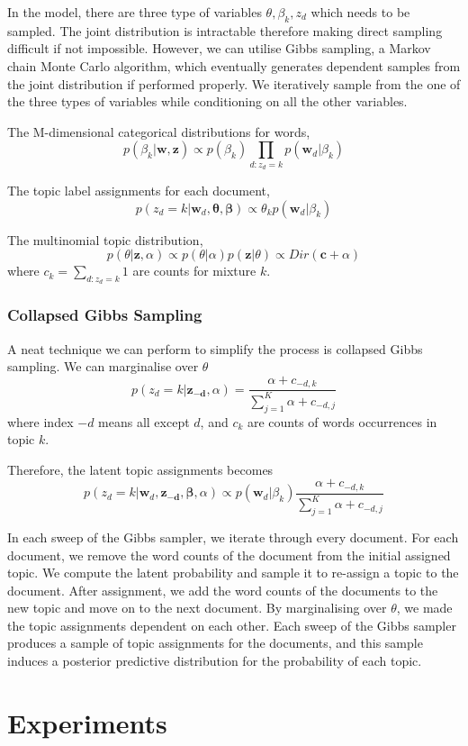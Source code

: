 \documentclass{article}
\begin{document}
In the model, there are three type of variables $\theta, \beta_k, z_d$ which needs to be sampled. The joint distribution is intractable therefore making direct sampling difficult if not impossible. However, we can utilise Gibbs sampling, a Markov chain Monte Carlo algorithm, which eventually generates dependent samples from the joint distribution if performed properly. We iteratively sample from the one of the three types of variables while conditioning on all the other variables.

The M-dimensional categorical distributions for words,
$$p(\beta_k|\bm{w}, \bm{z}) \propto p(\beta_k)\prod_{d:z_d=k}p(\bm{w}_d|\beta_k)$$

The topic label assignments for each document,
$$p(z_d = k|\bm{w}_d, \bm{\theta}, \bm{\beta}) \propto \theta_k p(\bm{w}_d|\beta_{k})$$

The multinomial topic distribution,
$$p(\theta|\bm{z}, \alpha) \propto p(\theta|\alpha) p(\bm{z}|\theta) \propto Dir(\bm{c}+\alpha)$$
where $c_k = \sum_{d:z_d=k} 1$ are counts for mixture $k$.

\subsubsection{Collapsed Gibbs Sampling}
A neat technique we can perform to simplify the process is collapsed Gibbs sampling. We can marginalise over $\theta$
$$p(z_d = k | \bm{z_{-d}}, \alpha) = \dfrac{\alpha + c_{-d,k}}{\sum_{j=1}^K \alpha + c_{-d,j}}$$
where index $-d$ means all except $d$, and $c_k$ are counts of words occurrences in topic $k$.

Therefore, the latent topic assignments becomes
$$p(z_d = k | \bm{w}_d, \bm{z_{-d}}, \bm{\beta},\alpha) \propto p(\bm{w}_d | \beta_k) \dfrac{\alpha + c_{-d,k}}{\sum_{j=1}^K \alpha + c_{-d,j}}$$

In each sweep of the Gibbs sampler, we iterate through every document. For each document, we remove the word counts of the document from the initial assigned topic. We compute the latent probability and sample it to re-assign a topic to the document. After assignment, we add the word counts of the documents to the new topic and move on to the next document. By marginalising over $\theta$, we made the topic assignments dependent on each other. Each sweep of the Gibbs sampler produces a sample of topic assignments for the documents, and this sample induces a posterior predictive distribution for the probability of each topic. 

\section{Experiments}
\end{document}
